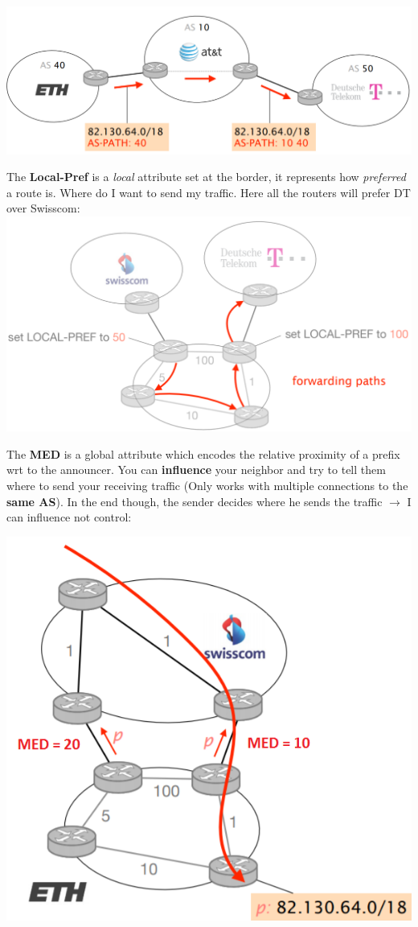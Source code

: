 \documentclass[a4paper, fontsize=8pt, landscape, DIV=1]{scrartcl}
\begin{document}
\begin{multicols*}{4}
		\includegraphics[width=\columnwidth]{images/Network_Layer/as_path.png}
		\par 
		The \textbf{Local-Pref} is a \textit{local} attribute set at the border, it
		represents how \textit{preferred} a route is. Where do I want to send my
		traffic. Here all the routers will prefer DT over Swisscom:\\
		\includegraphics[width=\columnwidth]{images/Network_Layer/local_pref.png}
		\par 
		The \textbf{MED} is a global attribute which encodes the relative proximity of
		a prefix wrt to the announcer. You can \textbf{influence} your neighbor and try
		to tell them where to send your receiving traffic (Only works with multiple
		connections to the \textbf{same AS}). In the end though, the sender decides
		where he sends the traffic $\rightarrow$ I can influence not control:\\
		\begin{center}
			\includegraphics[width=0.7\columnwidth]{images/Network_Layer/med.png}

\end{center}
\end{multicols*}
\end{document}
